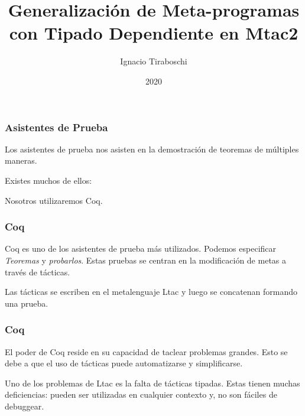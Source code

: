 \documentclass{beamer}
\title{Generalización de Meta-programas con Tipado Dependiente en Mtac2}
\author{Ignacio Tiraboschi}
\institute{Universidad Nacional de Córdoba - FAMAF}
\date{2020}
\begin{document}
\frame{\titlepage}

\begin{frame}
\frametitle{Asistentes de Prueba}

Los asistentes de prueba nos asisten en la demostración de teoremas de múltiples maneras.
\vspace{\baselineskip}

Existes muchos de ellos:
\vspace{\baselineskip}

Nosotros utilizaremos Coq.

\end{frame}

\begin{frame}
\frametitle{Coq}
Coq es uno de los asistentes de prueba más utilizados.
Podemos especificar \emph{Teoremas} y \emph{probarlos}.
Estas pruebas se centran en la modificación de metas a través de tácticas.
\vspace{\baselineskip}

Las tácticas se escriben en el metalenguaje Ltac y luego se concatenan formando una prueba.
\end{frame}


\begin{frame}
\frametitle{Coq}

El poder de Coq reside en su capacidad de taclear problemas grandes.
Esto se debe a que el uso de tácticas puede automatizarse y simplificarse.
\vspace{\baselineskip}

Uno de los problemas de Ltac es la falta de tácticas tipadas.
Estas tienen muchas deficiencias: pueden ser utilizadas en cualquier contexto y, no son fáciles de debuggear.
\end{frame}
\end{document}
